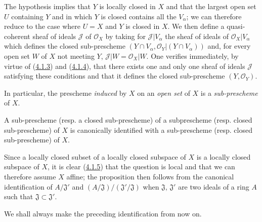 The hypothesis implies that $Y$ is locally closed in $X$ and that the largest
open set $U$ containing $Y$ and in which $Y$ is closed contains all the
$V_\alpha$; we can therefore reduce to the case where $U=X$ and $Y$ is closed
in $X$. We then define a quasi-coherent sheaf of ideals $\mathscr{J}$ of
$\mathscr{O}_X$ by taking for $\mathscr{J}|V_\alpha$ the sheaf of ideals of
$\mathscr{O}_X|V_\alpha$ which defines the closed sub-prescheme
$(Y\cap V_\alpha,\mathscr{O}_Y|(Y\cap V_\alpha))$ and, for every open set $W$
of $X$ not meeting $Y$, $\mathscr{J}|W=\mathscr{O}_X|W$. One verifies
immediately, by virtue of (\hyperref[I.4.1.3]{4.1.3}) and
(\hyperref[I.4.1.4]{4.1.4}), that there exists one and only one sheaf of
ideals $\mathscr{J}$ satisfying these conditions and that it defines the closed
sub-prescheme $(Y,\mathscr{O}_Y)$.

In particular, the prescheme \emph{induced} by $X$ on an \emph{open set} of
$X$ is a \emph{sub-prescheme} of $X$.

\begin{proposition}[4.1.6]
\label{I.4.1.6}
A sub-prescheme (resp. a closed sub-prescheme) of a
subprescheme (resp. closed sub-prescheme) of $X$
is canonically identified with a sub-prescheme (resp. closed sub-prescheme) of
$X$.
\end{proposition}

Since a locally closed subset of a locally closed subspace of $X$ is
a locally closed subspace of $X$, it is clear
(\hyperref[I.4.1.5]{4.1.5}) that the question is local and that we can
therefore assume $X$ affine; the proposition then follows from the canonical
identification of $A/\mathfrak{J}'$ and
$(A/\mathfrak{J})/(\mathfrak{J}'/\mathfrak{J})$ when
$\mathfrak{J}$, $\mathfrak{J}'$ are two ideals of a ring $A$ such that
$\mathfrak{J}\subset\mathfrak{J}'$.

We shall always make the preceding identification from now on.

